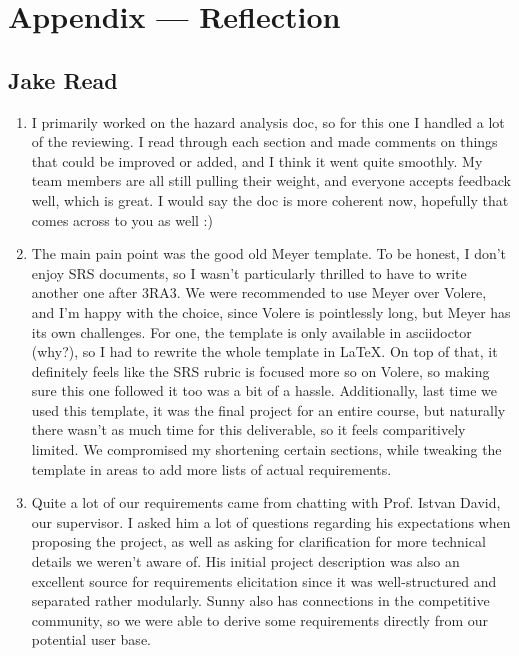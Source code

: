 \documentclass{article}
\begin{document}
\section*{Appendix --- Reflection}


\subsection*{Jake Read}\label{subsec:jake-read}
\begin{enumerate}
    \item I primarily worked on the hazard analysis doc, so for this one I handled a lot of the reviewing.
    I read through each section and made comments on things that could be improved or added, and I think it went quite smoothly.
    My team members are all still pulling their weight, and everyone accepts feedback well, which is great.
    I would say the doc is more coherent now, hopefully that comes across to you as well :)

    \item The main pain point was the good old Meyer template.
    To be honest, I don't enjoy SRS documents, so I wasn't particularly thrilled to have to write another one after 3RA3.
    We were recommended to use Meyer over Volere, and I'm happy with the choice, since Volere is pointlessly long, but Meyer has its own challenges.
    For one, the template is only available in asciidoctor (why?), so I had to rewrite the whole template in LaTeX\@.
    On top of that, it definitely feels like the SRS rubric is focused more so on Volere, so making sure this one followed it too was a bit of a hassle.
    Additionally, last time we used this template, it was the final project for an entire course, but naturally there wasn't as much time for this deliverable, so it feels comparitively limited.
    We compromised my shortening certain sections, while tweaking the template in areas to add more lists of actual requirements.

    \item Quite a lot of our requirements came from chatting with Prof. Istvan David, our supervisor.
    I asked him a lot of questions regarding his expectations when proposing the project, as well as asking for clarification for more technical details we weren't aware of.
    His initial project description was also an excellent source for requirements elicitation since it was well-structured and separated rather modularly.
    Sunny also has connections in the \emph{\Catan{}} competitive community, so we were able to derive some requirements directly from our potential user base.


\end{enumerate}
\end{document}
